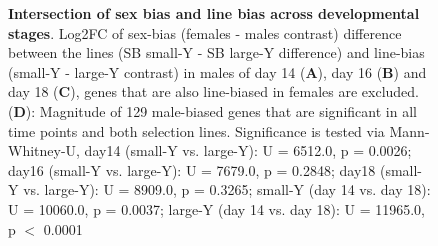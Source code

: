 \documentclass{article}
\begin{document}
\begin{figure}[H]
    \caption{\textbf{Intersection of sex bias and line bias across developmental stages}.
    Log2FC of sex-bias (females - males contrast) difference between the lines (SB small-Y - SB large-Y difference) and line-bias (small-Y - large-Y contrast) in males of day 14 (\textbf{A}), 
    day 16 (\textbf{B}) and day 18 (\textbf{C}), genes that are also line-biased in females are excluded. 
    (\textbf{D}): Magnitude of 129 male-biased genes that are significant in all time points and both selection lines. Significance is tested via Mann-Whitney-U, 
    day14 (small-Y vs. large-Y): U = 6512.0, p = 0.0026; 
    day16 (small-Y vs. large-Y): U = 7679.0, p = 0.2848; 
    day18 (small-Y vs. large-Y): U = 8909.0, p = 0.3265; 
    small-Y (day 14 vs. day 18): U = 10060.0, p = 0.0037; 
    large-Y (day 14 vs. day 18): U = 11965.0, p $<$ 0.0001
    }\label{sex_split}
    
\end{figure}


\iffalse
\end{document}
